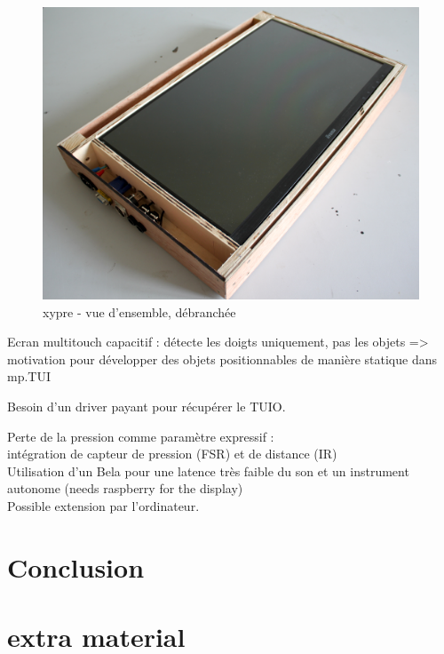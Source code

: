 \begin{figure}[!htbp]
	\includegraphics[width=\textwidth]{gfx/05_interfaces/xypre_overview_unplugged.jpg}
	\caption{xypre - vue d'ensemble, débranchée}
	\label{fig:interface:xypre}
\end{figure}

Ecran multitouch capacitif : détecte les doigts uniquement, pas les objets => motivation pour développer des objets positionnables de manière statique dans mp.TUI

Besoin d'un driver payant pour récupérer le TUIO.

Perte de la pression comme paramètre expressif :\\
intégration de capteur de pression (FSR) et de distance (IR)\\
Utilisation d'un Bela pour une latence très faible du son et un instrument autonome (needs raspberry for the display)\\
Possible extension par l'ordinateur.


\section{Conclusion}
\label{sec:interfaces:conclusion}


\section*{extra material}




 \cite{bin_hands_2017}

